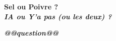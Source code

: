 {
\renewcommand{\quizreponses}{@@reponse|@@}
\begin{frame}[plain]
  \color{lightgray}
  \begin{center}
    {\fontsize{30}{34}\selectfont\bfseries\color{quizfonce}Sel ou Poivre {\normalsize ?}}\\[4pt]
    {\LARGE\bfseries\itshape\color{quizclair}IA ou Y'a pas (ou les deux) ?}
  \end{center}
  \vfill
  {\LARGE\bfseries\itshape @@question@@}
  \vfill
  \vfill
\end{frame}}
